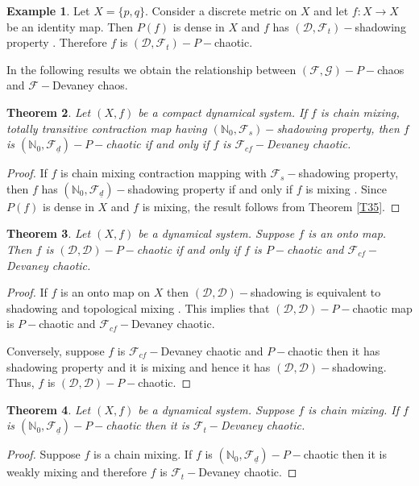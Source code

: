 \documentclass{amsart}[12pt, papera4]
\newtheorem{theorem}{Theorem}[section]
\theoremstyle{definition}
\newtheorem{example}[theorem]{Example}
\theoremstyle{remark}
\numberwithin{equation}{section}
\def\N{{\mathbb N}}
\def\F{{\mathscr{F}}}
\def\G{{\mathscr{G}}}
\begin{document}
\begin{example}\label{eg2}
	Let $X=\{p,q\}$. Consider a discrete metric on $X$ and let $f:X\longrightarrow X$ be an identity map. Then $P(f)$ is dense in $X$ and $f$ has $(\mathscr{D},\F_{t})-$shadowing property \cite{Oprocha2}. Therefore $f$ is $(\mathscr{D},\F_{t})-P-$chaotic.
	
\end{example}

\smallskip
\noindent In the following results we obtain the relationship between $(\F,\G)-P-$chaos and $\F-$Devaney chaos.



\begin{theorem}\label{3.4}
	Let $(X,f)$ be a compact dynamical system. If $f$ is chain mixing, totally transitive contraction map having $(\N_0,\F_s)-$shadowing property, then $f$ is $(\N_0,\F_{\underline{d}})-P-$chaotic if and only if $f$ is $\F_{cf}-$Devaney chaotic.
\end{theorem}
\begin{proof}
	If $f$ is chain mixing contraction mapping with $\F_s-$shadowing property, then $f$ has $(\N_0,\F_{\underline{d}})-$shadowing property if and only if $f$ is mixing \cite{darabi}. Since $P(f)$ is dense in $X$ and $f$ is mixing, the result follows from Theorem \ref{T35}.
\end{proof}

\begin{theorem}\label{3.5}
	Let $(X,f)$ be a dynamical system. Suppose $f$ is an onto map. Then $f$ is $(\mathscr{D},\mathscr{D})-P-$chaotic if and only if $f$ is $P-$chaotic and $\F_{cf}-$Devaney chaotic.
\end{theorem}
\begin{proof}
	If $f$ is an onto map on $X$ then $(\mathscr{D},\mathscr{D})-$shadowing is equivalent to shadowing and topological mixing \cite{Fakhari}. This implies that $(\mathscr{D},\mathscr{D})-P-$chaotic map is $P-$chaotic and $\F_{cf}-$Devaney chaotic. 
	
	\noindent Conversely, suppose $f$ is $\F_{cf}-$Devaney chaotic and $P-$chaotic then it has shadowing property and it is mixing and hence it has $(\mathscr{D},\mathscr{D})-$shadowing. Thus, $f$ is $(\mathscr{D},\mathscr{D})-P-$chaotic.
\end{proof}

\begin{theorem}\label{3.6}
	Let $(X,f)$ be a dynamical system. Suppose $f$ is chain mixing. If $f$ is $(\N_0,\F_{\underline{d}})-P-$chaotic then it is $\F_t-$Devaney chaotic.
\end{theorem}
\begin{proof}
	Suppose $f$ is a chain mixing. If $f$ is $(\N_0,\F_{\underline{d}})-P-$chaotic then it is weakly mixing \cite{Oprocha2} and therefore $f$ is $\F_t-$Devaney chaotic.
\end{proof}
\end{document}
